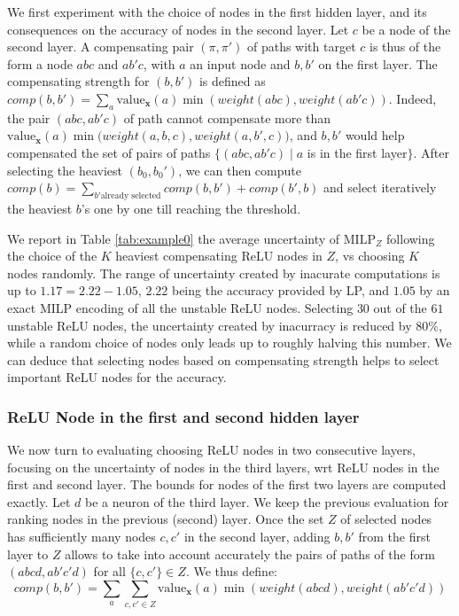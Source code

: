 \documentclass{llncs}
\newcommand{\vx}{\boldsymbol{x}}
\newcommand{\val}{{\textrm{value}}}
\newcommand{\MILP}{{\textrm{MILP}}}
\begin{document}
We first experiment with the choice of nodes in the first hidden layer, and its consequences on the accuracy of nodes in the second layer.  Let $c$ be a node of the second layer.
A compensating pair $(\pi,\pi')$ of paths with target $c$ is thus of the form a node $a b c$ and $a b' c$, with $a$ an input node and $b,b'$ on the first layer. The compensating strength for $(b,b')$ is defined as $comp(b,b')=\sum_a \val_{\vx}(a) \min(weight(abc),weight(ab'c))$. Indeed, the pair $(a b c,a b' c)$ of path cannot compensate more than $\val_{\vx}(a) \min(weight(a,b,c),$\newline $weight(a,b',c))$, and $b,b'$ would help compensated the set of pairs of paths $\{(a b c,a b' c) \mid a$ is in the first layer$\}$. After selecting the heaviest $(b_0,b_0')$, we can then compute $comp(b)= \sum_{b' \text{already selected}} comp(b,b')+comp(b',b)$ and select iteratively the heaviest $b$'s one by one till reaching the threshold. 

We report in Table \ref{tab:example0} the average uncertainty of $\MILP_Z$ following the choice of the $K$ heaviest compensating ReLU nodes in $Z$, vs choosing $K$ nodes randomly. The range of uncertainty created by inacurate computations is up to $1.17=2.22-1.05$, $2.22$ being the accuracy provided by LP, and $1.05$ by an exact MILP encoding of all the unstable ReLU nodes. Selecting $30$ out of the $61$ unstable ReLU nodes, the uncertainty created by inacurracy is reduced by $80\%$, while a random choice of nodes only leads up to roughly halving this number. We can deduce that selecting nodes based on compensating strength helps to select important ReLU nodes for the accuracy.



\newpage 

\subsubsection*{ReLU Node in the first and second hidden layer}

We now turn to evaluating choosing ReLU nodes in two consecutive layers, focusing on the uncertainty of nodes in the third layers, wrt ReLU nodes in the first and second layer.
The bounds for nodes of the first two layers are computed exactly. 
Let $d$ be a neuron of the third layer.
We keep the previous evaluation for ranking nodes in the previous (second) layer. 
Once the set $Z$ of selected nodes has sufficiently many nodes $c,c'$ in the second layer, adding $b,b'$ from the first layer to $Z$ allows to take into account accurately the pairs of paths of the form $(a b c d, a b' c' d)$ for all $\{c,c'\} \in Z$. We thus define:
\vspace{-0.2cm}
$$comp(b,b')=\sum_a \sum_{c,c' \in Z} \val_{\vx}(a) \min( weight(abcd),weight(ab'c'd))$$ 
\vspace{-0.2cm}
\end{document}
